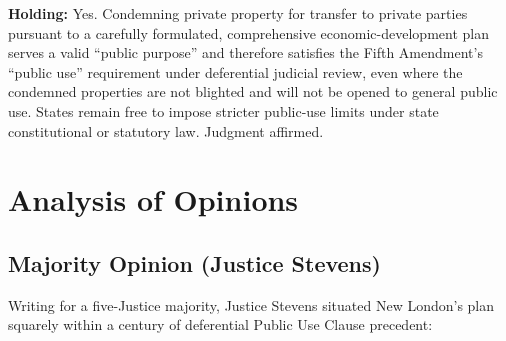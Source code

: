 \documentclass[12pt]{article}
\begin{document}
\textbf{Holding:} Yes. Condemning private property for transfer to private parties pursuant to a carefully formulated, comprehensive economic-development plan serves a valid ``public purpose'' and therefore satisfies the Fifth Amendment's ``public use'' requirement under deferential judicial review, even where the condemned properties are not blighted and will not be opened to general public use. States remain free to impose stricter public-use limits under state constitutional or statutory law. Judgment affirmed.

\section{Analysis of Opinions}
\subsection{Majority Opinion (Justice Stevens)}

Writing for a five-Justice majority, Justice Stevens situated New London's plan squarely within a century of deferential Public Use Clause precedent:
\end{document}
